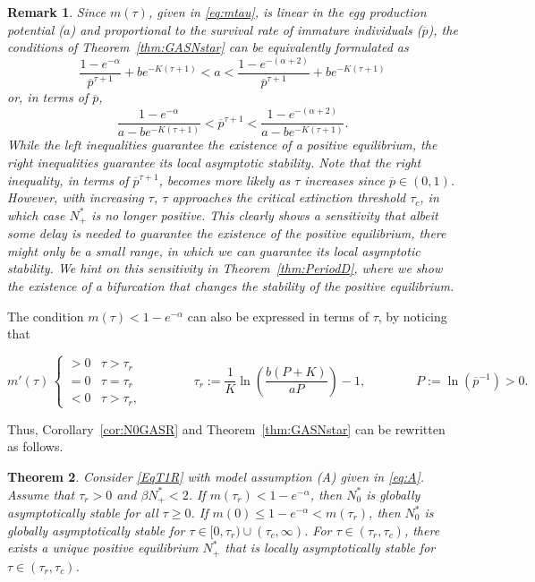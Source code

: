 \documentclass{article}
\newtheorem{theorem}{Theorem}
\numberwithin{theorem}{section}
\newtheorem{remark}[theorem]{Remark}
\begin{document}
{\begin{remark}
Since $m(\tau)$, given in \eqref{eq:mtau}, is linear in the egg production potential ($a$) and proportional to the survival rate of immature individuals ($\overline{p}$), the conditions of Theorem~\ref{thm:GASNstar} 
can be equivalently formulated as 
$$\frac{1-e^{-\alpha}}{\overline{p}^{\tau+1}}+be^{-K(\tau+1)}<a<\frac{1-e^{-(\alpha+2)}}{\overline{p}^{\tau+1}}+be^{-K(\tau+1)}$$
or, in terms of $\overline{p}$, 
$$\frac{1-e^{-\alpha}}{a-be^{-K(\tau+1)}}<\overline{p}^{\tau+1}<\frac{1-e^{-(\alpha+2)}}{a-be^{-K(\tau+1)}}.$$
While the left inequalities guarantee the existence of a positive equilibrium, the right inequalities guarantee its local asymptotic stability. 
Note that the right inequality, in terms of $\overline{p}^{\tau+1}$, becomes more likely as $\tau$ increases since $\overline{p}\in (0,1)$. However, with increasing $\tau$, $\tau$ approaches the critical extinction threshold $\tau_c$, in which case $N^*_+$ is no longer positive. This clearly shows a sensitivity that albeit some delay is needed to guarantee the existence of the positive equilibrium, there might only be a small range, in which we can guarantee its local asymptotic stability. We hint on this sensitivity in Theorem~\ref{thm:PeriodD}, where we show the existence of a bifurcation that changes the stability of the positive equilibrium.  
\end{remark}




The condition $m(\tau)<1-e^{-\alpha}$ can also be expressed in terms of $\tau$, by noticing that 

\begin{equation*}
m'(\tau) \, \begin{cases} >0 & \tau>\tau_r\\
=0 & \tau=\tau_r\\
<0 & \tau>\tau_r,
\end{cases}\qquad \qquad \tau_r:=\frac{1}{K}\ln \left( \frac{b(P+K)}{aP}\right)-1, \qquad \qquad P:=\ln(\overline{p}^{-1})>0.
\end{equation*}

Thus, Corollary~\ref{cor:N0GASR} and Theorem~\ref{thm:GASNstar} can be rewritten as follows.

\begin{theorem}
    Consider \eqref{EqT1R} with model assumption (A) given in \eqref{eq:A}. Assume that $\tau_r>0$ and $\beta N^*_+<2$. 
    If $m(\tau_r)<1-e^{-\alpha}$, then $N^*_0$ is globally asymptotically stable for all $\tau\geq 0$. If $m(0)\leq 1-e^{-\alpha}< m(\tau_r)$, then 
        $N^*_0$ is globally asymptotically stable for $\tau\in [0,\tau_r)\cup (\tau_c,\infty)$. For $\tau\in (\tau_r, \tau_c)$, there exists a unique positive equilibrium $N^*_+$ that is locally asymptotically stable for $\tau\in (\tau_r,\tau_c)$. 
\end{theorem}



}
\end{document}

